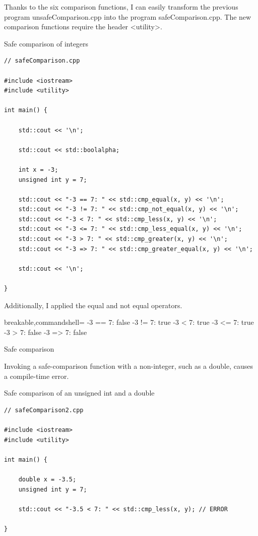 Thanks to the six comparison functions, I can easily transform the previous program unsafeComparison.cpp into the program safeComparison.cpp. The new comparison functions require the header <utility>.

\noindent
Safe comparison of integers
\begin{lstlisting}[style=styleCXX]
// safeComparison.cpp

#include <iostream>
#include <utility>

int main() {
	
	std::cout << '\n';
	
	std::cout << std::boolalpha;
	
	int x = -3;
	unsigned int y = 7;
	
	std::cout << "-3 == 7: " << std::cmp_equal(x, y) << '\n';
	std::cout << "-3 != 7: " << std::cmp_not_equal(x, y) << '\n';
	std::cout << "-3 < 7: " << std::cmp_less(x, y) << '\n';
	std::cout << "-3 <= 7: " << std::cmp_less_equal(x, y) << '\n';
	std::cout << "-3 > 7: " << std::cmp_greater(x, y) << '\n';
	std::cout << "-3 => 7: " << std::cmp_greater_equal(x, y) << '\n';
	
	std::cout << '\n';
	
}
\end{lstlisting}

Additionally, I applied the equal and not equal operators.

\begin{tcblisting}{breakable,commandshell={}}
-3 == 7: false
-3 != 7: true
-3 < 7: true
-3 <= 7: true
-3 > 7: false
-3 => 7: false
\end{tcblisting}

\begin{center}
Safe comparison
\end{center}

Invoking a safe-comparison function with a non-integer, such as a double, causes a compile-time error.

\noindent
Safe comparison of an unsigned int and a double
\begin{lstlisting}[style=styleCXX]
// safeComparison2.cpp

#include <iostream>
#include <utility>

int main() {
	
	double x = -3.5;
	unsigned int y = 7;
	
	std::cout << "-3.5 < 7: " << std::cmp_less(x, y); // ERROR
	
}
\end{lstlisting}

